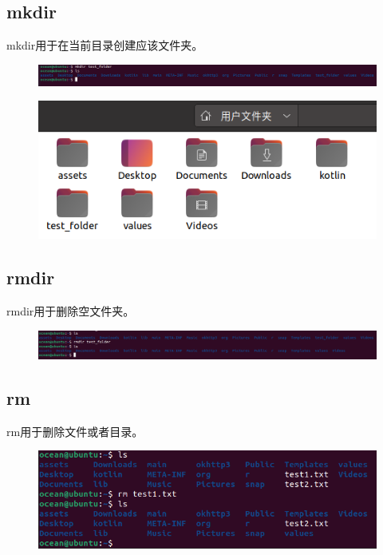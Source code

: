 \documentclass{article}
\begin{document}
\subsection{mkdir}
mkdir用于在当前目录创建应该文件夹。
\begin{figure}[H]
    \centering
    \includegraphics[width=1\linewidth]{mkdir.png}
\end{figure}
\begin{figure}[H]
    \centering
    \includegraphics[width=1\linewidth]{folder.png}
\end{figure}

\subsection{rmdir}
rmdir用于删除空文件夹。
\begin{figure}[H]
    \centering
    \includegraphics[width=1\linewidth]{rmdir.png}
\end{figure}

\subsection{rm}
rm用于删除文件或者目录。
\begin{figure}[H]
    \centering
    \includegraphics[width=1\linewidth]{rm.png}
\end{figure}
\end{document}
